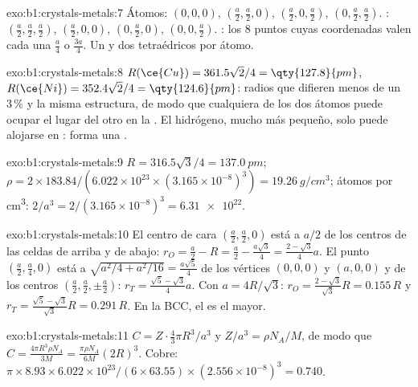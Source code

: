 \begin{solution}{exo:b1:crystals-metals:7}
Átomos: $(0,0,0)$, $(\frac a2,\frac a2,0)$, $(\frac a2,0,\frac a2)$,
$(0,\frac a2,\frac a2)$. : $(\frac a2,\frac a2,\frac a2)$,
$(\frac a2,0,0)$, $(0,\frac a2,0)$, $(0,0,\frac a2)$. :
los 8 puntos cuyas coordenadas valen cada una $\frac a4$ o
$\frac{3a}{4}$. Un  y dos tetraédricos por átomo.
\end{solution}

\begin{solution}{exo:b1:crystals-metals:8}
$R(\ce{Cu}) = 361.5\sqrt2/4 = \qty{127.8}{pm}$, $R(\ce{Ni}) = 352.4\sqrt2/4
= \qty{124.6}{pm}$: radios que difieren menos de un 3\,\% y la misma
estructura, de modo que cualquiera de los dos átomos puede ocupar el
lugar del otro en la . El hidrógeno, mucho más pequeño, solo puede
alojarse en : forma una .
\end{solution}

\begin{solution}{exo:b1:crystals-metals:9}
$R = 316.5\sqrt3/4 = \qty{137.0}{pm}$; $\rho = 2 \times 183.84/(6.022 \times
10^{23} \times (3.165 \times 10^{-8})^3) = \qty{19.26}{g/cm^3}$; átomos por
\unit{cm^3}: $2/a^3 = 2/(3.165 \times 10^{-8})^3 = \num{6.31e22}$.
\end{solution}

\begin{solution}{exo:b1:crystals-metals:10}
El centro de cara $(\frac a2,\frac a2,0)$ está a $a/2$ de los centros de
las celdas de arriba y de abajo: $r_O = \frac a2 - R = \frac a2 - \frac{a\sqrt3}{4}
= \frac{2-\sqrt3}{4}a$. El punto $(\frac a2,\frac a4,0)$ está a
$\sqrt{a^2/4 + a^2/16} = \frac{a\sqrt5}{4}$ de los vértices $(0,0,0)$ y
$(a,0,0)$ y de los centros $(\frac a2,\frac a2,\pm\frac a2)$:
$r_T = \frac{\sqrt5 - \sqrt3}{4}a$. Con $a = 4R/\sqrt3$:
$r_O = \frac{2-\sqrt3}{\sqrt3}R = 0.155\,R$ y
$r_T = \frac{\sqrt5-\sqrt3}{\sqrt3}R = 0.291\,R$. En la BCC, el  es el mayor.
\end{solution}

\begin{solution}{exo:b1:crystals-metals:11}
$C = Z\cdot\frac43\pi R^3/a^3$ y $Z/a^3 = \rho N_A/M$, de modo que $C =
\frac{4\pi R^3\rho N_A}{3M} = \frac{\pi\rho N_A}{6M}(2R)^3$. Cobre:
$\pi \times 8.93 \times 6.022 \times 10^{23}/(6 \times 63.55) \times (2.556
\times 10^{-8})^3 = 0.740$.
\end{solution}

